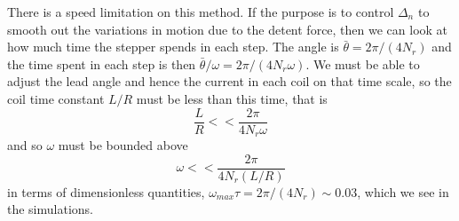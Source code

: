 \documentclass{article}
\begin{document}
\begin{appendix}
There is a speed limitation on this method. If the purpose is to control $\Delta_n$ to smooth out the variations in motion due to the detent force, then we can look at how much time the stepper spends in each step. The angle is $\bar{\theta} = 2\pi/(4 N_r)$ and the time spent in each step is then $\bar{\theta} / \omega = 2\pi/(4 N_r \omega)$. We must be able to adjust the lead angle and hence the current in each coil on that time scale, so the coil time constant $L/R$ must be less than this time, that is
\begin{equation}
\frac{L}{R} << \frac{2\pi}{4 N_r \omega}
\end{equation}
and so $\omega$ must be bounded above
\begin{equation}
 \omega << \frac{2\pi}{4 N_r (L/R)}
\end{equation}
in terms of dimensionless  quantities, $\omega_{max}\tau  = 2\pi/(4 N_r) \sim 0.03$, which we see in the simulations. 


\end{appendix}
\end{document}
